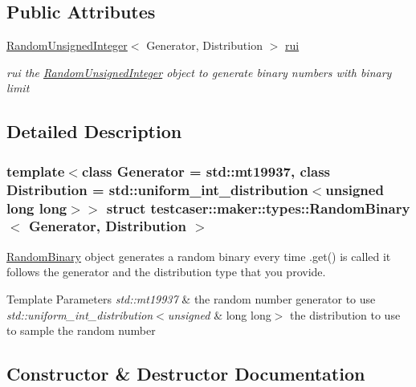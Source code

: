 \subsection*{Public Attributes}
\begin{DoxyCompactItemize}
\item 
\mbox{\hyperlink{classtestcaser_1_1maker_1_1types_1_1RandomUnsignedInteger}{Random\+Unsigned\+Integer}}$<$ Generator, Distribution $>$ \mbox{\hyperlink{structtestcaser_1_1maker_1_1types_1_1RandomBinary_a387cd99ad534bb762a37e931a227925e}{rui}}
\begin{DoxyCompactList}\small\item\em rui the \mbox{\hyperlink{classtestcaser_1_1maker_1_1types_1_1RandomUnsignedInteger}{Random\+Unsigned\+Integer}} object to generate binary numbers with binary limit \end{DoxyCompactList}\end{DoxyCompactItemize}


\subsection{Detailed Description}
\subsubsection*{template$<$class Generator = std\+::mt19937, class Distribution = std\+::uniform\+\_\+int\+\_\+distribution$<$unsigned long long$>$$>$\newline
struct testcaser\+::maker\+::types\+::\+Random\+Binary$<$ Generator, Distribution $>$}

\mbox{\hyperlink{structtestcaser_1_1maker_1_1types_1_1RandomBinary}{Random\+Binary}} object generates a random binary every time .get() is called it follows the generator and the distribution type that you provide. 


\begin{DoxyTemplParams}{Template Parameters}
{\em std\+::mt19937} & the random number generator to use \\
\hline
{\em std\+::uniform\+\_\+int\+\_\+distribution$<$unsigned} & long long$>$ the distribution to use to sample the random number \\
\hline
\end{DoxyTemplParams}


\subsection{Constructor \& Destructor Documentation}
\mbox{\label{structtestcaser_1_1maker_1_1types_1_1RandomBinary_a6d3f045cf7406fcedfa1d1188194f7a8}} 
